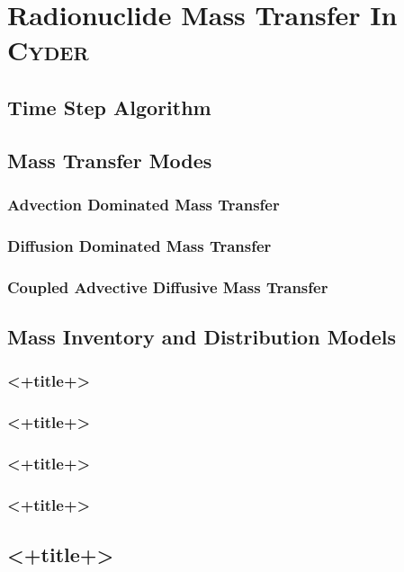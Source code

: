 
\section{Radionuclide Mass Transfer In \textsc{Cyder}}\label{sec:nuclide_models}


\subsection{Time Step Algorithm}\label{sec:timestep}


\subsection{Mass Transfer Modes}\label{sec:mass_transfer}

\subsubsection{Advection Dominated Mass Transfer}\label{sec:adv_mass_transfer}

\subsubsection{Diffusion Dominated Mass Transfer}\label{sec:dif_mass_transfer}

\subsubsection{Coupled Advective Diffusive Mass Transfer}\label{sec:adv_dif_mass_transfer}


\subsection{Mass Inventory and Distribution Models}


\subsubsection{<+title+>}\label{sec:<+label+>}

\subsubsection{<+title+>}\label{sec:<+label+>}

\subsubsection{<+title+>}\label{sec:<+label+>}

\subsubsection{<+title+>}\label{sec:<+label+>}

\subsection{<+title+>}\label{sec:<+label+>}
